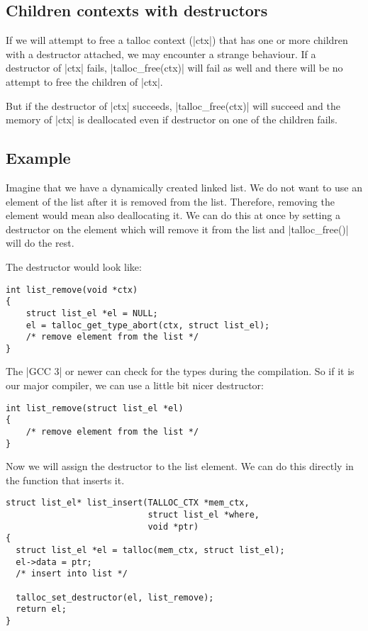 \subsection{Children contexts with destructors}

If we will attempt to free a talloc context (|ctx|) that has one or more
children with a destructor attached, we may encounter a strange behaviour. If a
destructor of |ctx| fails, |talloc_free(ctx)| will fail as well and there will
be no attempt to free the children of |ctx|.

But if the destructor of |ctx| succeeds, |talloc_free(ctx)| will succeed and
the memory of |ctx| is deallocated even if destructor on one of the children
fails.

\subsection{Example}

Imagine that we have a dynamically created linked list. We do not want to use an
element of the list after it is removed from the list. Therefore, removing the
element would mean also deallocating it. We can do this at once by setting a
destructor on the element which will remove it from the list and
|talloc_free()| will do the rest.

The destructor would look like:

\begin{lstlisting}[caption={Remove an element from the list -- destructor}]
int list_remove(void *ctx)
{
    struct list_el *el = NULL;
    el = talloc_get_type_abort(ctx, struct list_el);
    /* remove element from the list */    
}
\end{lstlisting}

\noindent
The |GCC 3| or newer can check for the types during the compilation. So if it is
our major compiler, we can use a little bit nicer destructor:

\begin{lstlisting}[caption={Remove an element from the list -- type safe
destructor}]
int list_remove(struct list_el *el)
{
    /* remove element from the list */    
}
\end{lstlisting}

\noindent
Now we will assign the destructor to the list element. We can do this directly
in the function that inserts it.

\begin{lstlisting}[caption={Remove an element from the list when freed},
morekeywords={talloc_set_destructor}]
struct list_el* list_insert(TALLOC_CTX *mem_ctx,
                            struct list_el *where,
                            void *ptr)
{
  struct list_el *el = talloc(mem_ctx, struct list_el);
  el->data = ptr;
  /* insert into list */
  
  talloc_set_destructor(el, list_remove);
  return el;
}
\end{lstlisting}

